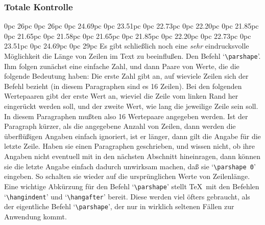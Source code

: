\subsubsection{Totale Kontrolle}
0pc 26pc
0pc 26pc
0pc 24.69pc
0pc 23.51pc
0pc 22.73pc
0pc 22.20pc
0pc 21.85pc
0pc 21.65pc
0pc 21.58pc
0pc 21.65pc
0pc 21.85pc
0pc 22.20pc
0pc 22.73pc
0pc 23.51pc
0pc 24.69pc
0pc 29pc
Es gibt schlie\ss{}lich noch eine {\em sehr} eindrucksvolle M\"oglichkeit
die L\"ange von Zeilen im Text zu beeinflu\ss{}en. Den Befehl
`\verb|\parshape|'. Ihm folgen zun\"achst eine einfache Zahl, und dann
Paare von Werte, die die folgende Bedeutung haben: Die erste Zahl
gibt an, auf wieviele Zeilen sich der Befehl bezieht (in diesem
Paragraphen sind es 16 Zeilen). Bei den folgenden Wertepaaren gibt der
erste Wert an, wieviel die Zeile vom linken
Rand her einger\"uckt werden
soll, und der zweite Wert, wie lang die jeweilige Zeile sein soll. In
diesem Paragraphen mu\ss{}ten also 16 Wertepaare angegeben werden. Ist der
Paragraph k\"urzer, als die angegebene Anzahl von Zeilen, dann werden
die \"uberfl\"u\ss{}igen Angaben einfach ignoriert, ist er l\"anger, dann gilt
die Angabe f\"ur die letzte Zeile. Haben sie einen Paragraphen
geschrieben, und wissen nicht, ob ihre Angaben nicht eventuell mit in
den n\"achsten Abschnitt hineinragen, dann k\"onnen sie die letzte Angabe
einfach dadurch unwirksam machen, da\ss{} sie `\verb|\parshape 0|'
eingeben. So schalten sie wieder auf die urspr\"unglichen Werte von
Zeilenl\"ange. Eine wichtige 
Abk\"urzung f\"ur den Befehl `\verb|\parshape|'
stellt \TeX\ mit den Befehlen 
`\verb|\hangindent|' und
`\verb|\hangafter|' bereit. Diese werden viel \"ofters gebraucht, als
der eigentliche Befehl `\verb|\parshape|', der nur in wirklich
seltenen F\"allen zur Anwendung kommt.

